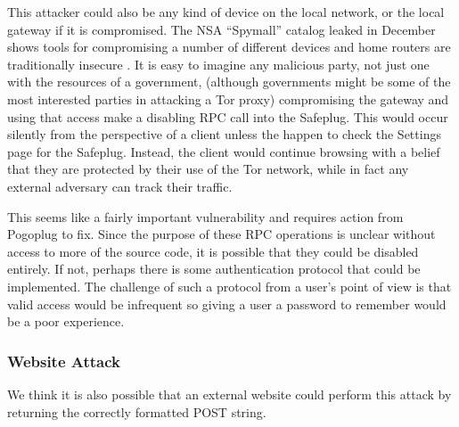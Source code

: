 This attacker could also be any kind of device on the local network, or the local gateway if it is compromised.  The NSA ``Spymall'' catalog leaked in December shows tools for compromising a number of different devices and home routers are traditionally insecure \cite{spymall}.  It is easy to imagine any malicious party, not just one with the resources of a government, (although governments might be some of the most interested parties in attacking a Tor proxy) compromising the gateway and using that access make a disabling RPC call into the Safeplug.  This would occur silently from the perspective of a client unless the happen to check the Settings page for the Safeplug.  Instead, the client would continue browsing with a belief that they are protected by their use of the Tor network, while in fact any external adversary can track their traffic.

This seems like a fairly important vulnerability and requires action from Pogoplug to fix.  Since the purpose of these RPC operations is unclear without access to more of the source code, it is possible that they could be disabled entirely.  If not, perhaps there is some authentication protocol that could be implemented.  The challenge of such a protocol from a user's point of view is that valid access would be infrequent so giving a user a password to remember would be a poor experience.


\subsubsection{Website Attack}
We think it is also possible that an external website could perform this attack by returning the correctly formatted POST string.  

